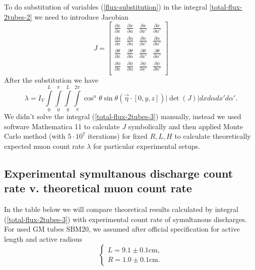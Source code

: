 \documentclass[main.tex]{subfiles}
\begin{document}
To do substitution of variables (\ref{flux-substitution}) in the integral \ref{total-flux-2tubes-2} we need to introduce Jacobian
\begin{equation}
J = 
\begin{bmatrix}
\frac{\partial x}{\partial x} & \frac{\partial x}{\partial \alpha} & \frac{\partial x}{\partial x'} & \frac{\partial x}{\partial \alpha'} \\
\frac{\partial \alpha}{\partial x} & \frac{\partial \alpha}{\partial \alpha} & \frac{\partial \alpha}{\partial x'} & \frac{\partial \alpha}{\partial \alpha'}\\
\frac{\partial \theta}{\partial x} & \frac{\partial \theta}{\partial \alpha} & \frac{\partial \theta}{\partial x'} & \frac{\partial \theta}{\partial \alpha'} \\
\frac{\partial \phi}{\partial x} & \frac{\partial \phi}{\partial \alpha} & \frac{\partial \phi}{\partial x'} & \frac{\partial \phi}{\partial \alpha'} \\
\end{bmatrix}
\end{equation}
After the substitution we have
\begin{equation}
\label{total-flux-2tubes-3}
\lambda = I_V\int\limits_{0}^L\int\limits_{0}^{\pi} \int\limits_{0}^L \int\limits_{\pi}^{2\pi}\cos^n\theta \sin\theta(\vec{\eta}\cdot [0,y,z]) |\det(J)| dxd\alpha dx'd\alpha'.
\end{equation}
We didn't solve the integral (\ref{total-flux-2tubes-3}) manually, instead we used software Mathematica 11 \cite{mathematica2018} to calculate $J$ symbolically and then applied Monte Carlo method (with $5\cdot 10^7$ iterations) for fixed $R, L, H$ to calculate theoretically expected muon count rate $\lambda$ for particular experimental setups.

\subsection{Experimental symultanous discharge count rate v. theoretical muon count rate}

In the table below we will compare theoretical results calculated by integral (\ref{total-flux-2tubes-3}) with experimental count rate of symultanous discharges. For used GM tubes SBM20, we assumed after official specification for active length and active radious
\begin{equation}
\begin{cases}
L = 9.1\pm0.1 \text{cm},\\
R = 1.0\pm0.1 \text{cm}.
\end{cases}
\end{equation}
\end{document}
